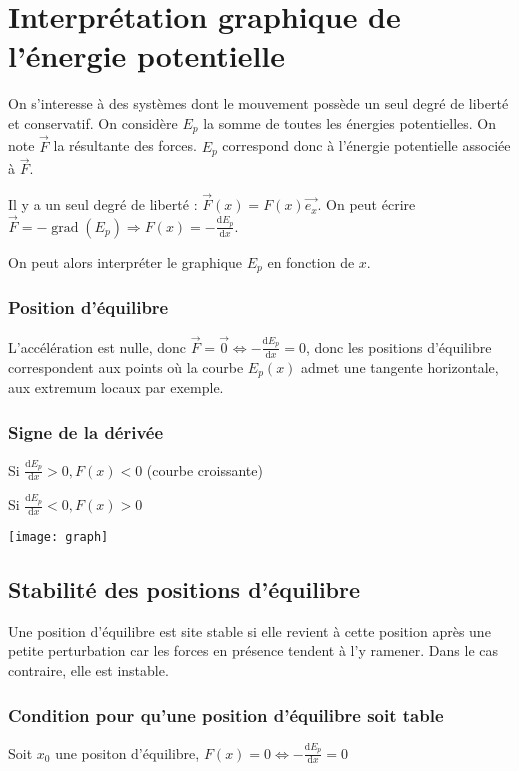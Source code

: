 \documentclass[french]{yLectureNote}
\renewcommand{\vec}{\overrightarrow}
\newcommand{\dd}[0]{\mathrm{d}}
\DeclareMathOperator\grad{grad}
\begin{document}
\section{Interprétation graphique de l'énergie potentielle}
On s'interesse à des systèmes dont le mouvement possède un seul degré de liberté et conservatif. On considère $E_p$ la somme de toutes les énergies potentielles. On note $\vec{F}$ la résultante des forces. $E_p$ correspond donc à l'énergie potentielle associée à $\vec{F}$.

Il y a un seul degré de liberté : $\vec{F}(x) = F(x)\vec{e_x}$. On peut écrire $\vec{F} = -\grad(E_p)\Rightarrow F(x) = -\frac{\dd E_p}{\dd x}$.

On peut alors interpréter le graphique $E_p$ en fonction de $x$.

\subsubsection{Position d'équilibre}
L'accélération est nulle, donc $\vec{F} = \vec{0} \iff -\frac{\dd E_p}{\dd x} =0$, donc les positions d'équilibre correspondent aux points où la courbe $E_p(x)$ admet une tangente horizontale, aux extremum locaux par exemple.
\subsubsection{Signe de la dérivée}
Si $\frac{\dd E_p}{\dd x}>0, F(x)<0$ (courbe croissante)

Si $\frac{\dd E_p}{\dd x}<0, F(x)>0$

\texttt{[image: graph]}
\subsection{Stabilité des positions d'équilibre}
\begin{definition}
Une position d'équilibre est site stable si elle revient à cette position après une petite perturbation car les forces en présence tendent à l'y ramener. Dans le cas contraire, elle est instable.
\end{definition}
\subsubsection{Condition pour qu'une position d'équilibre soit table}
Soit $x_0$ une positon d'équilibre, $F(x) = 0 \iff -\frac{\dd E_p}{\dd x} = 0$
\end{document}
